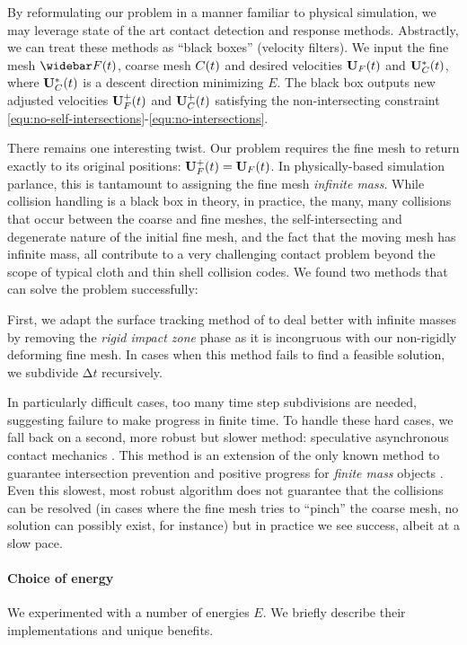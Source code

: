 By reformulating our problem in a manner familiar to physical simulation, we may leverage state of the art contact detection and response
methods.
%
Abstractly, we can treat these methods as ``black boxes'' (velocity filters). We input the
fine mesh $\Fflow(t)$, coarse mesh $C(t)$ and desired velocities
$\mathbf{U}_F(t)$ and $\mathbf{U}_C^*(t)$, where $\mathbf{U}_C^*(t)$ is a descent direction minimizing $E$. The black box outputs new adjusted velocities $\mathbf{U}^+_F(t)$ and
$\mathbf{U}^+_C(t)$ satisfying the non-intersecting constraint
\ref{equ:no-self-intersections}-\ref{equ:no-intersections}.

There remains one interesting twist. Our problem requires the fine mesh to
return exactly to its original positions: $\mathbf{U}^+_F(t) = \mathbf{U}_F(t)$. In
physically-based simulation parlance, this is tantamount to assigning the fine
mesh \emph{infinite mass}.
%
While collision handling is a black box in theory, in practice, the many, many collisions that occur between the coarse and fine meshes, the self-intersecting and degenerate nature of the initial fine mesh, and the fact that the moving mesh has infinite mass, all contribute to a very challenging contact problem beyond the scope of typical cloth and thin shell collision codes. We found two methods that can solve the problem successfully:

First, we adapt the surface tracking method of \cite{Brochu:2009} to deal
better with infinite masses by removing the \emph{rigid impact zone} phase as
it is incongruous with our non-rigidly deforming fine mesh. In cases when
this method fails to find a feasible solution, we subdivide $∆t$ recursively.

In particularly difficult cases, too many time step subdivisions are needed,
suggesting failure to make progress in finite time. To handle these hard cases,
we fall back on a second, more robust but slower method: speculative
asynchronous contact mechanics \cite{Ainsley:2012:SPA}. This method is an
extension of the only known method to guarantee intersection prevention and
positive progress for \emph{finite mass} objects \cite{Harmon:2009}. Even this
slowest, most robust algorithm does not guarantee that the collisions can be
resolved (in cases where the fine mesh tries to ``pinch'' the coarse mesh, no
solution can possibly exist, for instance) but in practice we see success,
albeit at a slow pace.

\paragraph{Choice of energy}
%
We experimented with a number of energies $E$. We briefly describe their
implementations and unique benefits.

